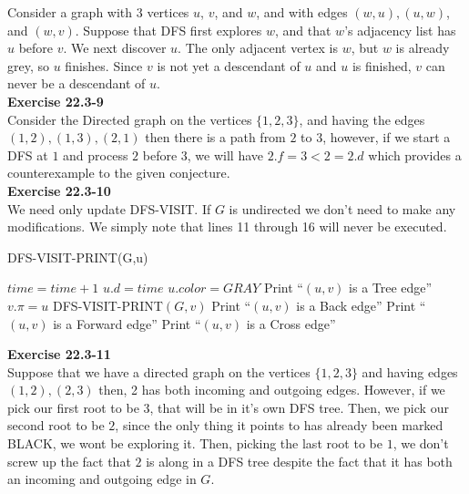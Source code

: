 \documentclass{article}
\begin{document}
Consider a graph with 3 vertices $u$, $v$, and $w$, and with edges $(w,u), (u,w)$, and $(w,v)$.  Suppose that DFS first explores $w$, and that $w$'s adjacency list has $u$ before $v$.  We next discover $u$.  The only adjacent vertex is $w$, but $w$ is already grey, so $u$ finishes. Since $v$ is not yet a descendant of $u$ and $u$ is finished, $v$ can never be a descendant of $u$. \\

\noindent\textbf{Exercise 22.3-9}\\

Consider the Directed graph on the vertices $\{1,2,3\}$, and having the edges $(1,2),(1,3),(2,1)$ then there is a path from $2$ to $3$, however, if we start a DFS at $1$ and process $2$ before $3$, we will have $2.f = 3 < 2 = 2.d$ which provides a counterexample to the given conjecture.\\

\noindent\textbf{Exercise 22.3-10}\\

We need only update DFS-VISIT.  If $G$ is undirected we don't need to make any modifications.  We simply note that lines 11 through 16 will never be executed. \\
\begin{algorithm}
\caption{DFS-VISIT-PRINT(G,u)}
\begin{algorithmic}[1]
\State $time = time + 1$
\State $u.d = time$
\State $u.color = GRAY$
		\State Print ``$(u,v)$ is a Tree edge''
		\State $v.\pi = u$
		\State DFS-VISIT-PRINT$(G,v)$
		\State Print ``$(u,v)$ is a Back edge''
	\Else
			\State Print ``$(u,v)$ is a Forward edge''
		\Else
			\State Print ``$(u,v)$ is a Cross edge''
		\EndIf
	\EndIf
\EndFor 
\end{algorithmic}
\end{algorithm}

\noindent\textbf{Exercise 22.3-11}\\

Suppose that we have a directed graph on the vertices $\{1,2,3\}$ and having edges $(1,2),(2,3)$ then, 2 has both incoming and outgoing edges. However, if we pick our first root to be $3$, that will be in it's own DFS tree. Then, we pick our second root to be $2$, since the only thing it points to has already been marked BLACK, we wont be exploring it. Then, picking the last root to be $1$, we don't screw up the fact that $2$ is along in a DFS tree despite the fact that it has both an incoming and outgoing edge in $G$.\\
\end{document}
